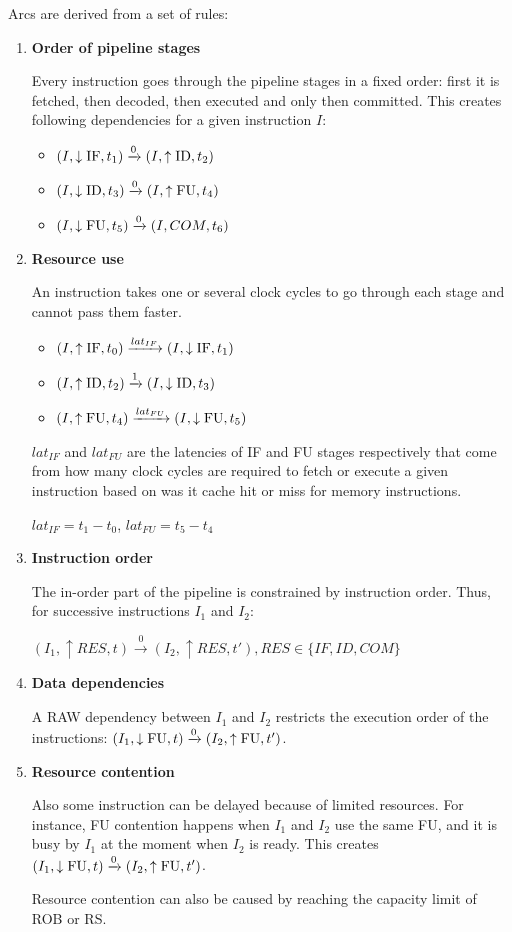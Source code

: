 Arcs are derived from a set of rules:
\begin{enumerate}
    \item \textbf{Order of pipeline stages}
    
    Every instruction goes through the pipeline stages in a fixed order: first it is fetched, then decoded, then executed and only then committed. This creates following dependencies for a given instruction $I$:

    \begin{itemize}
        \item $(I, \downarrow\mathrm{IF}, t_1) \xrightarrow{0} (I, \uparrow\mathrm{ID}, t_2)$
        \item $(I, \downarrow\mathrm{ID}, t_3) \xrightarrow{0} (I, \uparrow\mathrm{FU}, t_4)$
        \item $(I, \downarrow\mathrm{FU}, t_5)  \xrightarrow{0} (I, COM, t_6)$
    \end{itemize}

    \item \textbf{Resource use}

    An instruction takes one or several clock cycles to go through each stage and cannot pass them faster.

    \begin{itemize}
        \item $(I, \uparrow\mathrm{IF}, t_0) \xrightarrow{lat_{IF}} (I, \downarrow\mathrm{IF}, t_1)$
        \item $(I, \uparrow\mathrm{ID}, t_2) \xrightarrow{1} (I, \downarrow\mathrm{ID}, t_3)$
        \item $(I, \uparrow\mathrm{FU}, t_4)  \xrightarrow{lat_{FU}} (I, \downarrow\mathrm{FU}, t_5)$
    \end{itemize}

    $lat_{IF}$ and $lat_{FU}$ are the latencies of IF and FU stages respectively that come from how many clock cycles are required to fetch or execute a given instruction based on was it cache hit or miss for memory instructions.

    $lat_{IF} = t_1 - t_0$, $lat_{FU} = t_5 - t_4$

    \item \textbf{Instruction order}
    
    The in-order part of the pipeline is constrained by instruction order. Thus, for successive instructions $I_1$ and $I_2$:

    $(I_1,  \uparrow RES, t) \xrightarrow{0} (I_2, \uparrow RES, t'), RES \in \{IF, ID, COM\}$


    \item \textbf{Data dependencies}
    
    A RAW dependency between $I_1$ and $I_2$ restricts the execution order of the instructions:  $(I_1, \downarrow\mathrm{FU}, t) \xrightarrow{0} (I_2, \uparrow\mathrm{FU}, t')$.
    
    \item \textbf{Resource contention}
    
    Also some instruction can be delayed because of limited resources. For instance, FU contention happens when $I_1$ and $I_2$ use the same FU, and it is busy by $I_1$ at the moment when $I_2$ is ready. This creates $(I_1, \downarrow\mathrm{FU}, t) \xrightarrow{0} (I_2, \uparrow\mathrm{FU}, t')$. 

    Resource contention can also be caused by reaching the capacity limit of ROB or RS. 
\end{enumerate}
